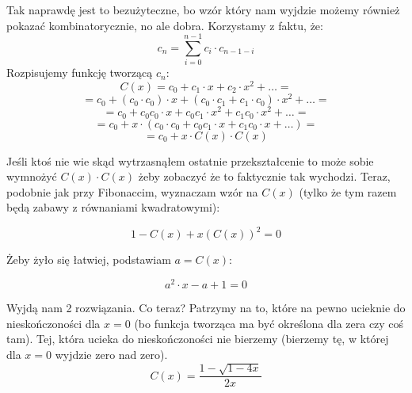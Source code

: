    Tak naprawdę jest to bezużyteczne, bo wzór który nam wyjdzie możemy również pokazać kombinatorycznie, no ale dobra. Korzystamy z faktu, że:
        \begin{equation*}
            c_n = \sum_{i = 0}^{n-1} c_i \cdot c_{n-1 - i}
        \end{equation*}
        Rozpisujemy funkcję tworzącą $c_n$:
        \begin{equation*}
            C(x) = c_0 + c_1 \cdot x + c_2 \cdot x^2 + \dots =
        \end{equation*}
        \begin{equation*}
           = c_0 + (c_0 \cdot c_0) \cdot x + (c_0 \cdot c_1 + c_1 \cdot c_0) \cdot x^2 + \dots =
        \end{equation*}
         \begin{equation*}
           = c_0 + c_0 c_0\cdot x + c_0c_1 \cdot x^2 + c_1c_0 \cdot x^2 + \dots =
        \end{equation*}
        \begin{equation*}
           = c_0 + x \cdot (c_0 \cdot c_0 + c_0c_1 \cdot x + c_1c_0 \cdot x + \dots ) =
        \end{equation*}
        \begin{equation*}
           = c_0 + x \cdot C(x) \cdot C(x)
        \end{equation*}

        Jeśli ktoś nie wie skąd wytrzasnąłem ostatnie przekształcenie to może sobie wymnożyć $C(x) \cdot C(x)$ żeby zobaczyć że to faktycznie tak wychodzi. Teraz, podobnie jak przy Fibonaccim, wyznaczam wzór na $C(x)$ (tylko że tym razem będą zabawy z równaniami kwadratowymi):

        \begin{equation*}
            1 - C(x) + x(C(x))^2 = 0
        \end{equation*}

        Żeby żyło się łatwiej, podstawiam $a = C(x)$:

        \begin{equation*}
            a^2 \cdot x - a + 1 = 0
        \end{equation*}

        Wyjdą nam 2 rozwiązania. Co teraz? Patrzymy na to, które na pewno ucieknie do nieskończoności dla $x = 0$ (bo funkcja tworząca ma być określona dla zera czy coś tam). Tej, która ucieka do nieskończoności nie bierzemy (bierzemy tę, w której dla $x=0$ wyjdzie zero nad zero). 
        \begin{equation*}
            C(x) = \frac{1 - \sqrt{1 - 4x}} {2x}
        \end{equation*}


